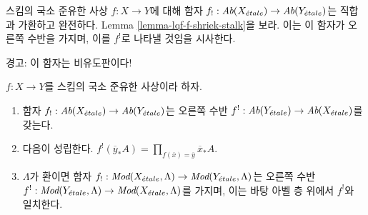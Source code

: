 \noindent
스킴의 국소 준유한 사상 $f : X \to Y$에 대해 함자
$f_! : \textit{Ab}(X_{\acute{e}tale}) \to \textit{Ab}(Y_{\acute{e}tale})$는 직합과
가환하고 완전하다. Lemma \ref{lemma-lqf-f-shriek-stalk}을 보라.
이는 이 함자가 오른쪽 수반을 가지며, 이를 $f^!$로 나타낼 것임을
시사한다.

\medskip\noindent
경고: 이 함자는 비유도판이다!

\begin{lemma}
\label{lemma-lqf-f-upper-shriek}
$f : X \to Y$를 스킴의 국소 준유한 사상이라 하자.
\begin{enumerate}
\item 함자 $f_! : \textit{Ab}(X_{\acute{e}tale}) \to \textit{Ab}(Y_{\acute{e}tale})$는
오른쪽 수반
$f^! : \textit{Ab}(Y_{\acute{e}tale}) \to \textit{Ab}(X_{\acute{e}tale})$를 갖는다.
\item 다음이 성립한다.
$f^!(\overline{y}_*A) = \prod_{f(\overline{x}) = \overline{y}} \overline{x}_*A$.
\item $\Lambda$가 환이면 함자
$f_! : \textit{Mod}(X_{\acute{e}tale}, \Lambda) \to
\textit{Mod}(Y_{\acute{e}tale}, \Lambda)$는 오른쪽 수반
$f^! : \textit{Mod}(Y_{\acute{e}tale}, \Lambda) \to
\textit{Mod}(X_{\acute{e}tale}, \Lambda)$를 가지며, 이는 바탕 아벨 층 위에서
$f^!$와 일치한다.
\end{enumerate}
\end{lemma}

